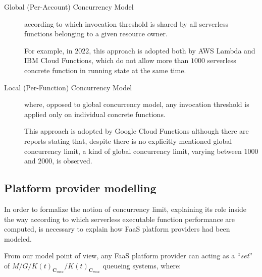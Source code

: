 \documentclass[12pt,a4paper]{report}
\theoremstyle{definition}
\begin{document}
\begin{description}
	\item[Global (Per-Account) Concurrency Model] according to which invocation threshold is shared by all serverless functions belonging to a given resource owner. 
	
	For example, in $2022$, this approach is adopted both by AWS Lambda and IBM Cloud Functions, which do not allow more than $1000$ serverless concrete function in running state at the same time.
	
	\item[Local (Per-Function) Concurrency Model] where, opposed to global concurrency model, any invocation threshold is applied only on individual concrete functions. 
	
	This approach is adopted by Google Cloud Functions although there are reports stating that, despite there is no explicitly mentioned global concurrency limit, a kind of global concurrency limit, varying between $1000$ and $2000$, is observed.
	
\end{description}

\subsection{Platform provider modelling}

In order to formalize the notion of concurrency limit, explaining its role inside the way according to which serverless executable function performance are computed, is necessary to explain how FaaS platform providers had been modeled.

From our model point of view, any FaaS platform provider can acting as a ``\textit{set}'' of $M/G/K(t)_{\textbf{C}_{max}}/K(t)_{\textbf{C}_{max}}$ queueing systems, where:
\end{document}
